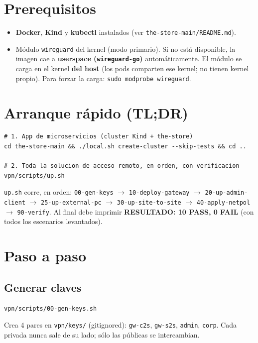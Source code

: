 \documentclass[11pt,a4paper]{article}
\newcommand{\cmd}[1]{\texttt{#1}}
\begin{document}
\section{Prerequisitos}
\begin{itemize}
  \item \textbf{Docker}, \textbf{Kind} y \textbf{kubectl} instalados (ver
        \cmd{the-store-main/README.md}).
  \item Módulo \cmd{wireguard} del kernel (modo primario). Si no está disponible,
        la imagen cae a \textbf{userspace (\cmd{wireguard-go})} automáticamente.
        El módulo se carga en el kernel \textbf{del host} (los pods comparten ese
        kernel; no tienen kernel propio). Para forzar la carga:
        \cmd{sudo modprobe wireguard}.
\end{itemize}

\section{Arranque rápido (TL;DR)}
\begin{lstlisting}
# 1. App de microservicios (cluster Kind + the-store)
cd the-store-main && ./local.sh create-cluster --skip-tests && cd ..

# 2. Toda la solucion de acceso remoto, en orden, con verificacion
vpn/scripts/up.sh
\end{lstlisting}

\noindent\cmd{up.sh} corre, en orden: \cmd{00-gen-keys} $\rightarrow$
\cmd{10-deploy-gateway} $\rightarrow$ \cmd{20-up-admin-client} $\rightarrow$
\cmd{25-up-external-pc} $\rightarrow$ \cmd{30-up-site-to-site} $\rightarrow$
\cmd{40-apply-netpol} $\rightarrow$ \cmd{90-verify}. Al final debe imprimir
\textbf{\textcolor{verdeok}{RESULTADO: 10 PASS, 0 FAIL}} (con todos los escenarios
levantados).

\section{Paso a paso}

\subsection{Generar claves}
\begin{lstlisting}
vpn/scripts/00-gen-keys.sh
\end{lstlisting}
Crea 4 pares en \cmd{vpn/keys/} (gitignored): \cmd{gw-c2s}, \cmd{gw-s2s},
\cmd{admin}, \cmd{corp}. Cada privada nunca sale de su lado; sólo las públicas se
intercambian.
\end{document}
